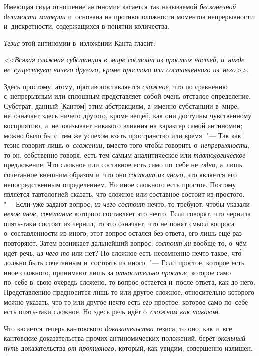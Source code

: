 Имеющая сюда отношение антиномия касается так называемой
{\em бесконечной делимости материи} и~основана на
противоположности моментов непрерывности и~дискретности, содержащихся в
понятии количества.

{\em Тезис} этой антиномии в~изложении Канта гласит:

{\em <<Всякая сложная субстанция в~мире состоит из простых частей, и~нигде
не~существует ничего другого, кроме простого или составленного
из~него>>}.

Здесь простому, атому, противопоставляется {\em сложное,} что по сравнению
с~непрерывным или сплошным представляет собой очень отсталое определение.
Субстрат, данный [Кантом] этим абстракциям, а~именно субстанции в~мире,
не~означает здесь ничего другого, кроме вещей, как они доступны чувственному
восприятию, и~не~оказывает никакого влияния на характер самой антиномии; можно
было бы с~тем же успехом взять пространство или время. "--- Так как тезис
говорит лишь о~{\em сложении,} вместо того чтобы говорить
о~{\em непрерывности,} то он, собственно говоря, есть тем самым аналитическое
или {\em тавтологическое} предложение. Что сложное или составное есть само
по~себе не~{\em одно,} а~лишь сочетанное внешним образом и~что оно
{\em состоит из иного,} это является его непосредственным определением.
Но иное сложного есть простое. Поэтому является тавтологией сказать, что
сложное или составное состоит из простого. "--- Если уже задают вопрос,
{\em из чего состоит} нечто, то требуют, чтобы указали
{\em некое иное, сочетание} которого составляет это нечто. Если говорят, что
чернила опять-таки состоят из чернил, то это означает, что не понят смысл
вопроса о~составленности из иного; этот вопрос остался без ответа, его лишь
ещё раз повторяют. Затем возникает дальнейший вопрос: {\em состоит ли} вообще
то, о~чём идёт речь, {\em из чего-то} или нет? Но сложное есть несомненно нечто
такое, чт\'{о} должно быть сочетанным и~состоять из иного. "--- Если простое,
которое есть иное сложного, принимают лишь за {\em относительно простое,}
которое само по~себе в~свою очередь сложено, то вопрос остаётся и~после
ответа, как до него. Представлению предносится лишь то или другое сложное,
относительно которого можно указать, что то или другое нечто есть
{\em его} простое, которое само по~себе есть опять-таки сложное. Но здесь
речь идёт о~{\em сложном как таковом}.

Что касается теперь кантовского {\em доказательства}
тезиса, то оно, как и~все кантовские доказательства прочих антиномических
положений, берёт {\em окольный путь} доказательства
{\em от противного,} который, как увидим, совершенно излишен.

